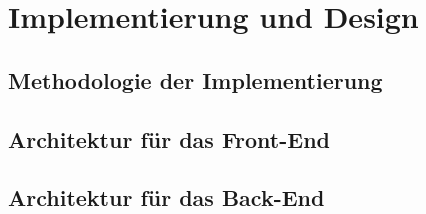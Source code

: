 \chapter{Implementierung und Design}

\section{Methodologie der Implementierung}

\section{Architektur für das Front-End}

\section{Architektur für das Back-End}